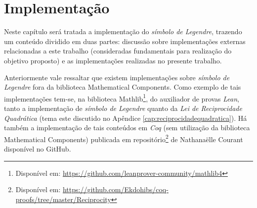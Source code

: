 \chapter{Implementação}
\label{cap:implementacao}

Neste capítulo será tratada a implementação do \textit{símbolo de Legendre}, trazendo um conteúdo dividido em duas partes: discussão sobre implementações externas relacionadas a este trabalho (consideradas fundamentais para realização do objetivo proposto) e as implementações realizadas no presente trabalho.
        
Anteriormente vale ressaltar que existem implementações sobre \textit{símbolo de Legendre} fora da biblioteca Mathematical Components. Como exemplo de tais implementações tem-se, na biblioteca Mathlib\footnote{Disponível em: \url{https://github.com/leanprover-community/mathlib4}}, do auxiliador de provas \textit{Lean}, tanto a implementação de \textit{símbolo de Legendre} quanto da \textit{Lei de Reciprocidade Quadrática}
(tema este discutido no Apêndice \ref{cap:reciprocidadequadratica}). Há também a implementação de tais conteúdos em \textit{Coq} (sem utilização da biblioteca Mathematical Components) publicada em repositório\footnote{Disponível em: \url{https://github.com/Ekdohibs/coq-proofs/tree/master/Reciprocity}} de Nathanaëlle Courant disponível no GitHub.


